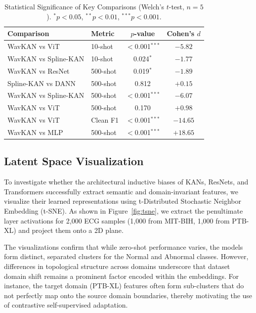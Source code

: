 \documentclass[journal,twoside,web]{ieeecolor}
\begin{document}
\begin{table}[!t]
\centering
\caption{Statistical Significance of Key Comparisons (Welch's $t$-test, $n=5$). $^{*}p<0.05$, $^{**}p<0.01$, $^{***}p<0.001$.}
\label{tab:significance}
\begin{tabular}{@{}llcc@{}}
\toprule
\textbf{Comparison} & \textbf{Metric} & \textbf{$p$-value} & \textbf{Cohen's $d$} \\
\midrule
WavKAN vs ViT         & 10-shot   & $<$0.001$^{***}$ & $-5.82$ \\
WavKAN vs Spline-KAN  & 10-shot   & 0.024$^{*}$   & $-1.77$ \\
WavKAN vs ResNet      & 500-shot  & 0.019$^{*}$   & $-1.89$ \\
Spline-KAN vs DANN  & 500-shot  & 0.812         & $+0.15$ \\
WavKAN vs Spline-KAN  & 500-shot  & $<$0.001$^{***}$ & $-6.07$ \\
WavKAN vs ViT         & 500-shot  & 0.170         & $+0.98$ \\
WavKAN vs ViT         & Clean F1  & $<$0.001$^{***}$ & $-14.65$ \\
WavKAN vs MLP         & 500-shot  & $<$0.001$^{***}$ & $+18.65$ \\
\bottomrule
\end{tabular}
\end{table}

\subsection{Latent Space Visualization}

To investigate whether the architectural inductive biases of KANs, ResNets, and Transformers successfully extract semantic and domain-invariant features, we visualize their learned representations using t-Distributed Stochastic Neighbor Embedding (t-SNE). As shown in Figure~\ref{fig:tsne}, we extract the penultimate layer activations for 2,000 ECG samples (1,000 from MIT-BIH, 1,000 from PTB-XL) and project them onto a 2D plane. 

The visualizations confirm that while zero-shot performance varies, the models form distinct, separated clusters for the Normal and Abnormal classes. However, differences in topological structure across domains underscore that dataset domain shift remains a prominent factor encoded within the embeddings. For instance, the target domain (PTB-XL) features often form sub-clusters that do not perfectly map onto the source domain boundaries, thereby motivating the use of contrastive self-supervised adaptation.
\end{document}
